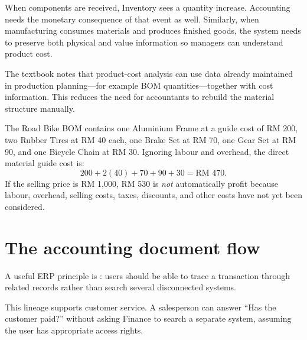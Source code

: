 When components are received, Inventory sees a quantity increase. Accounting needs the monetary consequence of that event as well. Similarly, when manufacturing consumes materials and produces finished goods, the system needs to preserve both physical and value information so managers can understand product cost.

The textbook notes that product-cost analysis can use data already maintained in production planning---for example BOM quantities---together with cost information. This reduces the need for accountants to rebuild the material structure manually.

\begin{workedexample}
The Road Bike BOM contains one Aluminium Frame at a guide cost of RM 200, two Rubber Tires at RM 40 each, one Brake Set at RM 70, one Gear Set at RM 90, and one Bicycle Chain at RM 30. Ignoring labour and overhead, the direct material guide cost is:
\[
200 + 2(40)+70+90+30=\text{RM }470.
\]
If the selling price is RM 1,000, RM 530 is \emph{not} automatically profit because labour, overhead, selling costs, taxes, discounts, and other costs have not yet been considered.
\end{workedexample}

\section{The accounting document flow}

A useful ERP principle is : users should be able to trace a transaction through related records rather than search several disconnected systems.

\begin{erpfigure}
\end{erpfigure}

This lineage supports customer service. A salesperson can answer ``Has the customer paid?'' without asking Finance to search a separate system, assuming the user has appropriate access rights.

